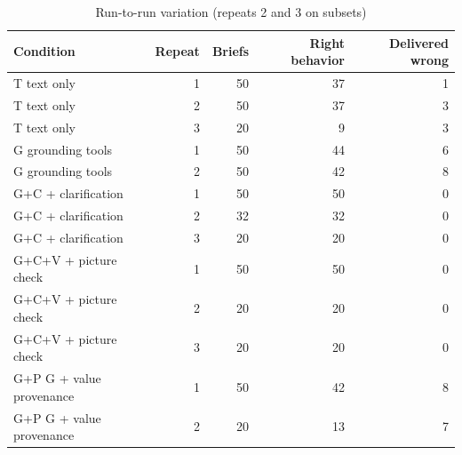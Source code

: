 \begin{table}[t]
\centering\small
\caption{Run-to-run variation (repeats 2 and 3 on subsets)}
\label{tab:t6_x2_repeats}
\begin{tabular}{lrrrr}
\toprule
Condition & Repeat & Briefs & Right behavior & Delivered wrong \\
\midrule
T text only & 1 & 50 & 37 & 1 \\
T text only & 2 & 50 & 37 & 3 \\
T text only & 3 & 20 & 9 & 3 \\
G grounding tools & 1 & 50 & 44 & 6 \\
G grounding tools & 2 & 50 & 42 & 8 \\
G+C + clarification & 1 & 50 & 50 & 0 \\
G+C + clarification & 2 & 32 & 32 & 0 \\
G+C + clarification & 3 & 20 & 20 & 0 \\
G+C+V + picture check & 1 & 50 & 50 & 0 \\
G+C+V + picture check & 2 & 20 & 20 & 0 \\
G+C+V + picture check & 3 & 20 & 20 & 0 \\
G+P G + value provenance & 1 & 50 & 42 & 8 \\
G+P G + value provenance & 2 & 20 & 13 & 7 \\
\bottomrule
\end{tabular}
\end{table}
